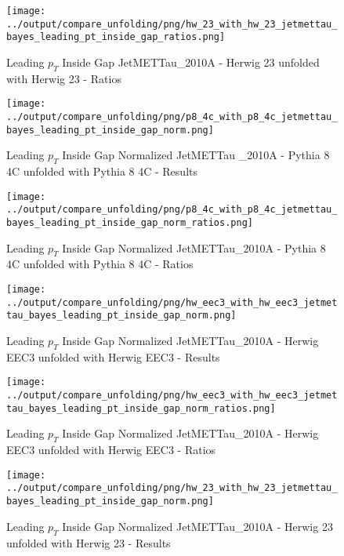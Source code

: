\documentclass[11pt]{book}
\begin{document}
\begin{figure}[ht]
\centering
\texttt{[image: ../output/compare\_unfolding/png/hw\_23\_with\_hw\_23\_jetmettau\_bayes\_leading\_pt\_inside\_gap\_ratios.png]}
\caption{Leading $p_{T}$ Inside Gap JetMETTau\_2010A - Herwig 23 unfolded with Herwig 23 - Ratios}
\label{hw_23_hw_23_jetmettau_bayes_leading_pt_inside_gap_b}
\end{figure}


\begin{figure}[ht]
\centering
\texttt{[image: ../output/compare\_unfolding/png/p8\_4c\_with\_p8\_4c\_jetmettau\_bayes\_leading\_pt\_inside\_gap\_norm.png]}
\caption{Leading $p_{T}$ Inside Gap Normalized JetMETTau \_2010A - Pythia 8 4C unfolded with Pythia 8 4C - Results}
\label{p8_p8_jetmettau_bayes_leading_pt_inside_gap_norm_a}
\end{figure}

\begin{figure}[ht]
\centering
\texttt{[image: ../output/compare\_unfolding/png/p8\_4c\_with\_p8\_4c\_jetmettau\_bayes\_leading\_pt\_inside\_gap\_norm\_ratios.png]}
\caption{Leading $p_{T}$ Inside Gap Normalized JetMETTau\_2010A - Pythia 8 4C unfolded with Pythia 8 4C - Ratios}
\label{p8_p8_jetmettau_bayes_leading_pt_inside_gap_norm_b}
\end{figure}

\begin{figure}[ht]
\centering
\texttt{[image: ../output/compare\_unfolding/png/hw\_eec3\_with\_hw\_eec3\_jetmettau\_bayes\_leading\_pt\_inside\_gap\_norm.png]}
\caption{Leading $p_{T}$ Inside Gap Normalized JetMETTau\_2010A - Herwig EEC3 unfolded with Herwig EEC3 - Results}
\label{hw_eec3_hw_eec3_jetmettau_bayes_leading_pt_inside_gap_norm_a}
\end{figure}

\begin{figure}[ht]
\centering
\texttt{[image: ../output/compare\_unfolding/png/hw\_eec3\_with\_hw\_eec3\_jetmettau\_bayes\_leading\_pt\_inside\_gap\_norm\_ratios.png]}
\caption{Leading $p_{T}$ Inside Gap Normalized JetMETTau\_2010A - Herwig EEC3 unfolded with Herwig EEC3 - Ratios}
\label{hw_eec3_hw_eec3_jetmettau_bayes_leading_pt_inside_gap_norm_b}
\end{figure}

\begin{figure}[ht]
\centering
\texttt{[image: ../output/compare\_unfolding/png/hw\_23\_with\_hw\_23\_jetmettau\_bayes\_leading\_pt\_inside\_gap\_norm.png]}
\caption{Leading $p_{T}$ Inside Gap Normalized JetMETTau\_2010A - Herwig 23 unfolded with Herwig 23 - Results}
\label{hw_23_hw_23_jetmettau_bayes_leading_pt_inside_gap_norm_a}
\end{figure}
\end{document}
